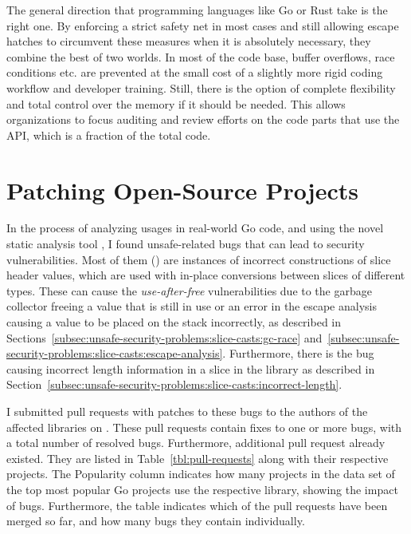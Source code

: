 The general direction that programming languages like Go or Rust take is the right one.
By enforcing a strict safety net in most cases and still allowing escape hatches to circumvent these measures when it is
absolutely necessary, they combine the best of two worlds.
In most of the code base, buffer overflows, race conditions etc. are prevented at the small cost of a slightly more
rigid coding workflow and developer training.
Still, there is the option of complete flexibility and total control over the memory if it should be needed.
This allows organizations to focus auditing and review efforts on the code parts that use the \unsafe{} \acrshort{API},
which is a fraction of the total code.



\section{Patching Open-Source Projects}\label{sec:discussion:patches}

In the process of analyzing \unsafe{} usages in real-world Go code, and using the novel static analysis tool
\toolSafer{}, I found \numberBugsFixed{} unsafe-related bugs that can lead to security vulnerabilities.
Most of them () are instances of incorrect constructions of slice header values, which are used with
in-place conversions between slices of different types.
These can cause the \textit{use-after-free} vulnerabilities due to the garbage collector freeing a value that is still
in use or an error in the escape analysis causing a value to be placed on the stack incorrectly, as described in
Sections~\ref{subsec:unsafe-security-problems:slice-casts:gc-race}
and~\ref{subsec:unsafe-security-problems:slice-casts:escape-analysis}.
Furthermore, there is the bug causing incorrect length information in a slice in the \goFuse{} library as described in
Section~\ref{subsec:unsafe-security-problems:slice-casts:incorrect-length}.

I submitted \numberPRs{} pull requests with patches to these bugs to the authors of the affected libraries on
\github{}.
These pull requests contain fixes to one or more bugs, with a total number of \numberBugsFixed{} resolved bugs.
Furthermore,  additional pull request already existed.
They are listed in Table~\ref{tbl:pull-requests} along with their respective \github{} projects.
The Popularity column indicates how many projects in the data set of the top \projsTotal{} most popular Go projects use
the respective library, showing the impact of bugs.
Furthermore, the table indicates which of the pull requests have been merged so far, and how many bugs they contain
individually.

